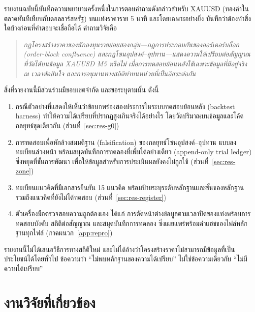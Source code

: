 \documentclass[11pt,a4paper]{article}
\newcommand{\tw}[1]{\texorpdfstring{\hspace{0pt}\mbox{#1}\hspace{0pt}}{#1}}
\begin{document}
รายงานฉบับนี้บันทึกความพยายามครั้งหนึ่งในการตอบคำถามดังกล่าวสำหรับ XAUUSD
(ทองคำในตลาดทันทีเทียบกับดอลลาร์สหรัฐ) บนแท่งราคาราย 5 นาที
และโดยเฉพาะอย่างยิ่ง บันทึกว่าต้องทำสิ่งใดบ้างก่อนที่คำตอบจะเชื่อถือได้ คำถามวิจัยคือ

\begin{quote}
\emph{กฎโครงสร้างราคาของนักลงทุน\tw{รายย่อย}สองกลุ่ม---กฎการประกอบกันของ\tw{ออร์เดอร์บล็อก}
(order-block confluence) และกฎโซนอุปสงค์--อุปทาน---แสดงความได้เปรียบต่อสัญญาณที่วัดได้บนข้อมูล
XAUUSD M5 หรือไม่ เมื่อการทดสอบย้อนหลังใช้เฉพาะข้อมูลที่มีอยู่จริง ณ เวลา\tw{ตัดสินใจ}
และการอนุมานทางสถิติทำบนหน่วยที่เป็นอิสระต่อกัน}
\end{quote}

สิ่งที่รายงานนี้มีส่วนร่วมมีขอบเขตจำกัด และขอระบุตามนั้น ดังนี้
\begin{enumerate}
\item กรณีตัวอย่างที่แสดงให้เห็นว่าข้อบกพร่องสองประการในระบบทดสอบย้อนหลัง (backtest harness)
ทำให้ความได้เปรียบที่ปรากฏสูงเกินจริงได้อย่างไร โดยวัดปริมาณบนข้อมูลและโค้ดกลยุทธ์ชุดเดียวกัน
(\tw{ส่วนที่}~\ref{sec:res-g0})
\item การทดสอบเพื่อหักล้างสมมติฐาน (falsification) ของกลยุทธ์โซนอุปสงค์--อุปทาน
แบบลงทะเบียน\tw{ล่วงหน้า} พร้อมสมุดบันทึกการทดลองที่เพิ่มได้อย่างเดียว (append-only trial ledger)
ซึ่งหยุดที่ขั้นการพัฒนา เพื่อให้ข้อมูลสำหรับการประเมินผลยังคงไม่ถูกใช้ (\tw{ส่วนที่}~\ref{sec:res-zone})
\item ทะเบียน\tw{แนวคิดที่}มีเอกสารยืนยัน 15 แนวคิด พร้อมป้ายระบุระดับ\tw{หลักฐาน}และชั้นของ\tw{หลักฐาน}
รวมถึง\tw{แนวคิดที่}ยังไม่ได้ทดสอบ (\tw{ส่วนที่}~\ref{sec:res-register})
\item ตัว\tw{เครื่องมือ}\tw{ตรวจสอบ}ความถูกต้องเอง ได้แก่ การตัดหน้าต่างข้อมูลตามเวลาปิดของแท่งพร้อมการทดสอบบังคับ
สถิติต่อสัญญาณ และสมุดบันทึกการทดลอง ซึ่งเผยแพร่พร้อมค่าแฮชของไฟล์\tw{หลักฐาน}ทุกไฟล์
(\tw{ภาคผนวก}~\ref{app:repro})
\end{enumerate}
รายงานนี้ไม่ได้เสนอวิธีการทางสถิติใหม่ และไม่ได้อ้างว่าโครงสร้างราคาไม่สามารถมีข้อมูลที่เป็นประโยชน์ได้โดยทั่วไป
ข้อความว่า ``ไม่พบ\tw{หลักฐาน}ของความได้เปรียบ'' ไม่ใช่ข้อความเดียวกับ ``ไม่มีความได้เปรียบ''

\section{งานวิจัยที่เกี่ยวข้อง}
\end{document}
